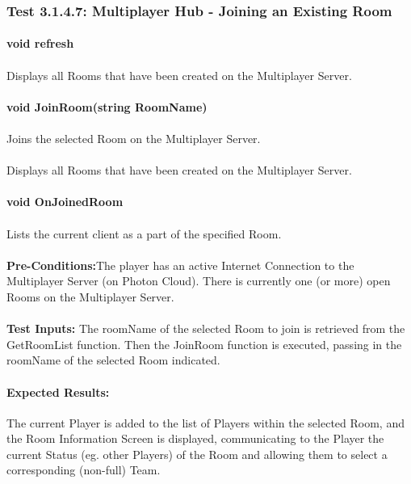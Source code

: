 \documentclass{article}
\begin{document}
     \subsubsection{Test 3.1.4.7: Multiplayer Hub - Joining an Existing Room}
    \paragraph{}\textbf{void refresh}
    \paragraph{} Displays all Rooms that have been created on the Multiplayer Server.
    \paragraph{}\textbf{void JoinRoom(string RoomName)}
    \paragraph{} Joins the selected Room on the Multiplayer Server.
    \paragraph{} Displays all Rooms that have been created on the Multiplayer Server.
    \paragraph{}\textbf{void OnJoinedRoom}
    \paragraph{} Lists the current client as a part of the specified Room.
    \paragraph{}\textbf{Pre-Conditions:}The player has an active Internet Connection to the Multiplayer Server (on Photon Cloud). There is currently one (or more) open Rooms on the Multiplayer Server.
    \paragraph{}\textbf{Test Inputs:} The roomName of the selected Room to join is retrieved from the GetRoomList function. Then the JoinRoom function is executed, passing in the roomName of the selected Room indicated.
    \paragraph{Expected Results:} The current Player is added to the list of Players within the selected Room, and the Room Information Screen is displayed, communicating to the Player the current Status (eg. other Players) of the Room and allowing them to select a corresponding (non-full) Team.
\end{document}
